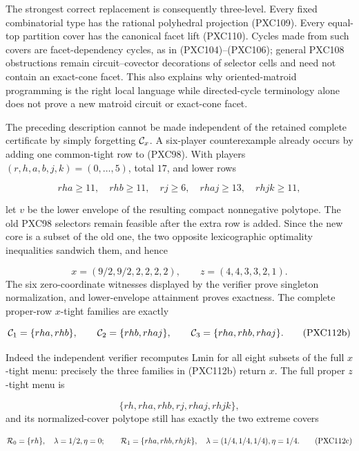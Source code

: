 \documentclass[11pt]{article}
\begin{document}
The strongest correct replacement is consequently three-level.  Every
fixed combinatorial type has the rational polyhedral projection (PXC109).
Every equal-top partition cover has the canonical facet lift (PXC110).
Cycles made from such covers are facet-dependency cycles, as in
(PXC104)--(PXC106); general PXC108 obstructions remain circuit--covector
decorations of selector cells and need not contain an exact-cone facet.
This also explains why oriented-matroid programming is the right local
language while directed-cycle terminology alone does not prove a new
matroid circuit or exact-cone facet.

The preceding description cannot be made independent of the retained
complete certificate by simply forgetting \({\cal C}_x\).  A six-player
counterexample already occurs by adding one common-tight row to (PXC98).
With players \((r,h,a,b,j,k)=(0,\ldots,5)\), total \(17\), and lower rows

\begin{equation}
 rha\ge11,\quad rhb\ge11,\quad rj\ge6,\quad
 rhaj\ge13,\quad rhjk\ge11,                              \tag{PXC112a}
\end{equation}

let \(v\) be the lower envelope of the resulting compact nonnegative
polytope.  The old PXC98 selectors remain feasible after the extra row is
added.  Since the new core is a subset of the old one, the two opposite
lexicographic optimality inequalities sandwich them, and hence

\[
 x=(9/2,9/2,2,2,2,2),\qquad z=(4,4,3,3,2,1).
\]
The six zero-coordinate witnesses displayed by the verifier prove singleton
normalization, and lower-envelope attainment proves exactness.  The complete
proper-row \(x\)-tight families are exactly

\[
 {\cal C}_1=\{rha,rhb\},\qquad
 {\cal C}_2=\{rhb,rhaj\},\qquad
 {\cal C}_3=\{rha,rhb,rhaj\}.                            \tag{PXC112b}
\]

Indeed the independent verifier recomputes Lmin for all eight subsets of the
full \(x\)-tight menu: precisely the three families in (PXC112b) return
\(x\).  The full proper \(z\)-tight menu is

\[
 \{rh,rha,rhb,rj,rhaj,rhjk\},
\]
and its normalized-cover polytope still has exactly the two extreme covers

\[
 {\cal R}_0=\{rh\},\quad\lambda=1/2, \eta=0;\qquad
 {\cal R}_1=\{rha,rhb,rhjk\},\quad
 \lambda=(1/4,1/4,1/4), \eta=1/4.                        \tag{PXC112c}
\]
\end{document}
